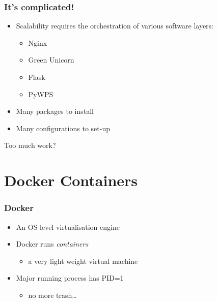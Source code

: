 \documentclass{beamer}
\begin{document}
\begin{frame}
\frametitle<presentation>{It's complicated!}

\begin{itemize}
  \item Scalability requires the orchestration of various software layers:
   \begin{itemize}
	  \item Nginx
	  \item Green Unicorn
	  \item Flask
	  \item PyWPS 
	\end{itemize}
  \item Many packages to install
  \item Many configurations to set-up
\end{itemize}

\vspace{0.4cm}
\centering
\Large{Too much work?}

\end{frame}

\section{Docker Containers}

\begin{frame}
\frametitle<presentation>{Docker}


\begin{itemize}
  \item An OS level virtualisation engine
  \item Docker runs \textit{containers}
  \begin{itemize} \item a very light weight virtual machine \end{itemize}
  \item Major running process has PID=1
   \begin{itemize}
	  \item no more trash\ldots
	\end{itemize}
\end{itemize}

\end{frame}
\end{document}
